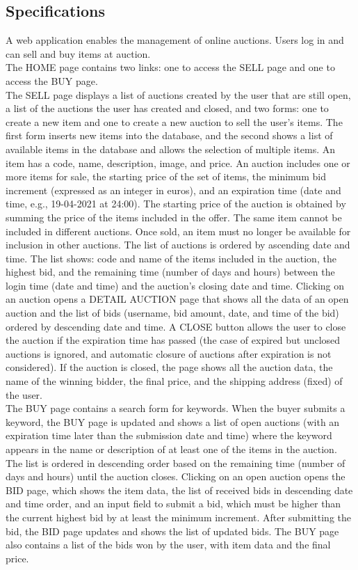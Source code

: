 \documentclass[12pt, a4paper, renqo, final]{amsart}
\begin{document}
	\subsection{Specifications}
	A web application enables the management of online auctions. Users log in and can sell and buy items at auction.\\The HOME page contains two links: one to access the SELL page and one to access the BUY page.\\The SELL page displays a list of auctions created by the user that are still open, a list of the auctions the user has created and closed, and two forms: one to create a new item and one to create a new auction to sell the user's items. The first form inserts new items into the database, and the second shows a list of available items in the database and allows the selection of multiple items. An item has a code, name, description, image, and price. An auction includes one or more items for sale, the starting price of the set of items, the minimum bid increment (expressed as an integer in euros), and an expiration time (date and time, e.g., 19-04-2021 at 24:00). The starting price of the auction is obtained by summing the price of the items included in the offer. The same item cannot be included in different auctions. Once sold, an item must no longer be available for inclusion in other auctions. The list of auctions is ordered by ascending date and time. The list shows: code and name of the items included in the auction, the highest bid, and the remaining time (number of days and hours) between the login time (date and time) and the auction's closing date and time. Clicking on an auction opens a DETAIL AUCTION page that shows all the data of an open auction and the list of bids (username, bid amount, date, and time of the bid) ordered by descending date and time. A CLOSE button allows the user to close the auction if the expiration time has passed (the case of expired but unclosed auctions is ignored, and automatic closure of auctions after expiration is not considered). If the auction is closed, the page shows all the auction data, the name of the winning bidder, the final price, and the shipping address (fixed) of the user.\\The BUY page contains a search form for keywords. When the buyer submits a keyword, the BUY page is updated and shows a list of open auctions (with an expiration time later than the submission date and time) where the keyword appears in the name or description of at least one of the items in the auction. The list is ordered in descending order based on the remaining time (number of days and hours) until the auction closes. Clicking on an open auction opens the BID page, which shows the item data, the list of received bids in descending date and time order, and an input field to submit a bid, which must be higher than the current highest bid by at least the minimum increment. After submitting the bid, the BID page updates and shows the list of updated bids. The BUY page also contains a list of the bids won by the user, with item data and the final price.
\end{document}
